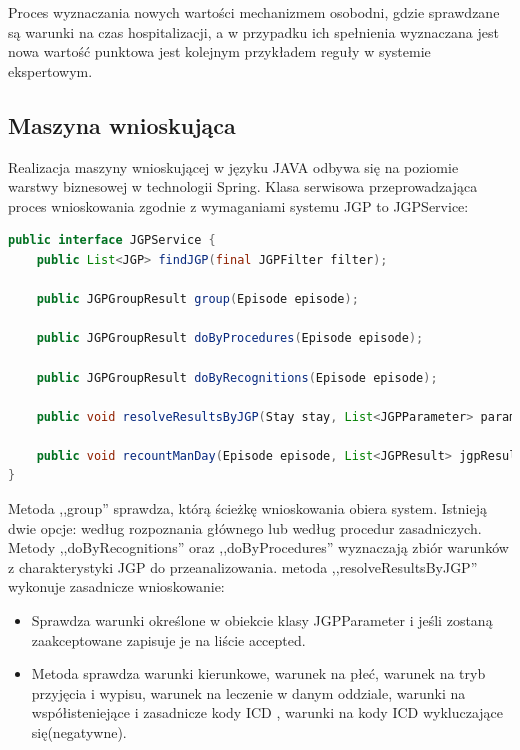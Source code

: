 Proces wyznaczania nowych wartości mechanizmem osobodni, gdzie sprawdzane są warunki na czas hospitalizacji, a w przypadku ich spełnienia wyznaczana jest nowa wartość punktowa jest kolejnym przykładem reguły w systemie ekspertowym.

\subsection{Maszyna wnioskująca}
\label{sec:maszynaWnioskujaca}
Realizacja maszyny wnioskującej w języku JAVA odbywa się na poziomie warstwy biznesowej w technologii Spring. Klasa serwisowa przeprowadzająca proces wnioskowania zgodnie z wymaganiami systemu JGP to JGPService:

\begin{lstlisting}[language=Java,caption={Deklaracja interfejsu serwisu JGP. Autor: Mateusz Urbanik},label=java_jgp_service]
public interface JGPService {
    public List<JGP> findJGP(final JGPFilter filter);

    public JGPGroupResult group(Episode episode);

    public JGPGroupResult doByProcedures(Episode episode);

    public JGPGroupResult doByRecognitions(Episode episode);

    public void resolveResultsByJGP(Stay stay, List<JGPParameter> parameters, JGPGroupResult jgpGroupResult);

    public void recountManDay(Episode episode, List<JGPResult> jgpResultList);
}
\end{lstlisting}

Metoda ,,group'' sprawdza, którą ścieżkę wnioskowania obiera system. Istnieją dwie opcje: według rozpoznania głównego lub według procedur zasadniczych. Metody ,,doByRecognitions'' oraz ,,doByProcedures'' wyznaczają zbiór warunków z charakterystyki JGP do przeanalizowania. metoda ,,resolveResultsByJGP'' wykonuje zasadnicze wnioskowanie:
\begin{itemize}\itemsep1pt
 \item Sprawdza warunki określone w obiekcie klasy JGPParameter i jeśli zostaną zaakceptowane zapisuje je na liście accepted.
 \item Metoda sprawdza warunki kierunkowe, warunek na płeć, warunek na tryb przyjęcia i wypisu, warunek na leczenie w danym oddziale, warunki na współisteniejące i zasadnicze kody ICD , warunki na kody ICD wykluczające się(negatywne).
\end{itemize}

